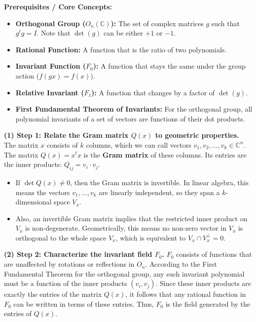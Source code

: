 \begin{solution}
\textbf{Prerequisites / Core Concepts:}
\begin{itemize}
    \item \textbf{Orthogonal Group ($O_n(\mathbb{C})$):} The set of complex matrices $g$ such that $g^t g = I$. Note that $\det(g)$ can be either $+1$ or $-1$.
    \item \textbf{Rational Function:} A function that is the ratio of two polynomials.
    \item \textbf{Invariant Function ($F_0$):} A function that stays the same under the group action ($f(gx) = f(x)$).
    \item \textbf{Relative Invariant ($F_1$):} A function that changes by a factor of $\det(g)$.
    \item \textbf{First Fundamental Theorem of Invariants:} For the orthogonal group, all polynomial invariants of a set of vectors are functions of their dot products.
\end{itemize}

\textbf{(1) Step 1: Relate the Gram matrix $Q(x)$ to geometric properties.}
The matrix $x$ consists of $k$ columns, which we can call vectors $v_1, v_2, \dots, v_k \in \mathbb{C}^n$.
The matrix $Q(x) = x^t x$ is the \textbf{Gram matrix} of these columns. Its entries are the inner products: $Q_{ij} = v_i \cdot v_j$.
\begin{itemize}
    \item If $\det Q(x) \neq 0$, then the Gram matrix is invertible. In linear algebra, this means the vectors $v_1, \dots, v_k$ are linearly independent, so they span a $k$-dimensional space $V_x$.
    \item Also, an invertible Gram matrix implies that the restricted inner product on $V_x$ is non-degenerate. Geometrically, this means no non-zero vector in $V_x$ is orthogonal to the whole space $V_x$, which is equivalent to $V_x \cap V_x^\perp = 0$.
\end{itemize}

\textbf{(2) Step 2: Characterize the invariant field $F_0$.}
$F_0$ consists of functions that are unaffected by rotations or reflections in $O_n$.
According to the First Fundamental Theorem for the orthogonal group, any such invariant polynomial must be a function of the inner products $(v_i, v_j)$.
Since these inner products are exactly the entries of the matrix $Q(x)$, it follows that any rational function in $F_0$ can be written in terms of these entries. Thus, $F_0$ is the field generated by the entries of $Q(x)$.


\end{solution}
